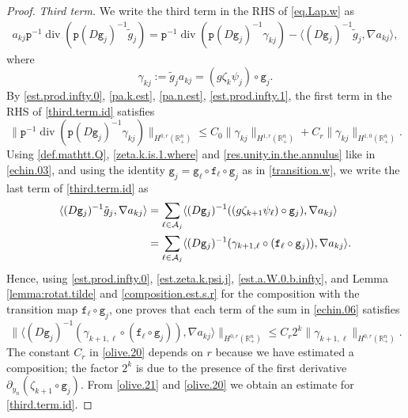 \documentclass[10pt,a4paper]{amsart}
\newcommand{\R}{{\mathbb R}}
\DeclareMathOperator{\divergence}{div}
\newcommand{\grad}{\nabla}
\newcommand{\la}{\langle}
\newcommand{\mA}{\mathcal{A}}
\newcommand{\pa}{\partial}
\newcommand{\ra}{\rangle}
\begin{document}
\begin{proof}
\emph{Third term.} We write the third term in the RHS of \eqref{eq.Lap.w} as 
\begin{align}
a_{kj} \mathtt p^{-1} \divergence (\mathtt p (D \mathtt g_j)^{-1} \tilde g_j) 
= \mathtt p^{-1} \divergence (\mathtt p (D \mathtt g_j)^{-1} \gamma_{kj}) 
- \la (D \mathtt g_j)^{-1} \tilde g_j , \grad a_{kj} \ra,
\label{third.term.id}
\end{align}
where 
\begin{equation} \label{def.gamma.nkj}
\gamma_{kj} := \tilde g_j a_{kj} 
= (g \zeta_k \psi_j) \circ \mathtt g_j.
\end{equation}
By \eqref{est.prod.infty.0}, \eqref{pa.k.est}, \eqref{pa.n.est}, 
\eqref{est.prod.infty.1}, the first term in the RHS of \eqref{third.term.id} satisfies 
\begin{equation}  \label{olive.21}
\| \mathtt p^{-1} \divergence (\mathtt p (D \mathtt g_j)^{-1} \gamma_{kj}) \|_{H^{0,r}(\R^n_+)} 
\leq C_0 \| \gamma_{kj} \|_{H^{1,r}(\R^n_+)} + C_r \| \gamma_{kj} \|_{H^{1,0}(\R^n_+)}.
\end{equation}
Using \eqref{def.mathtt.Q}, \eqref{zeta.k.is.1.where} and \eqref{res.unity.in.the.annulus} 
like in \eqref{echin.03}, and using the identity 
$\mathtt g_j = \mathtt g_\ell \circ \mathtt f_\ell \circ \mathtt g_j$ as in \eqref{transition.w},
we write the last term of \eqref{third.term.id} as 
\begin{align}
\la (D \mathtt g_j)^{-1} \tilde g_j , \grad a_{kj} \ra
& = \sum_{\ell \in \mA_j} 
\la (D \mathtt g_j)^{-1} ((g \zeta_{k+1} \psi_\ell) \circ \mathtt g_j) , \grad a_{kj} \ra
\notag \\
& = \sum_{\ell \in \mA_j} 
\la (D \mathtt g_j)^{-1} (\gamma_{k+1, \ell} \circ (\mathtt f_\ell \circ \mathtt g_j)) , \grad a_{kj} \ra.
\label{echin.06}
\end{align}
Hence, using \eqref{est.prod.infty.0}, 
\eqref{est.zeta.k.psi.j}, 
\eqref{est.a.W.0.b.infty}, 
and Lemma \ref{lemma:rotat.tilde} and \eqref{composition.est.s.r} 
for the composition with the transition map $\mathtt f_\ell \circ \mathtt g_j$,
one proves that each term of the sum in \eqref{echin.06} satisfies 
\begin{equation} \label{olive.20}
\| \la (D \mathtt g_j)^{-1} (\gamma_{k+1, \ell} \circ (\mathtt f_\ell \circ \mathtt g_j)) , 
\grad a_{kj} \ra \|_{H^{0,r}(\R^n_+)} 
\leq C_r 2^k \| \gamma_{k+1, \ell} \|_{H^{0,r}(\R^n_+)}.
\end{equation}
The constant $C_r$ in \eqref{olive.20} depends on $r$ 
because we have estimated a composition; 
the factor $2^k$ is due to the presence 
of the first derivative $\pa_{y_n} (\zeta_{k+1} \circ \mathtt g_j)$.  
From \eqref{olive.21} and \eqref{olive.20} we obtain an estimate for \eqref{third.term.id}.



\end{proof}
\end{document}

